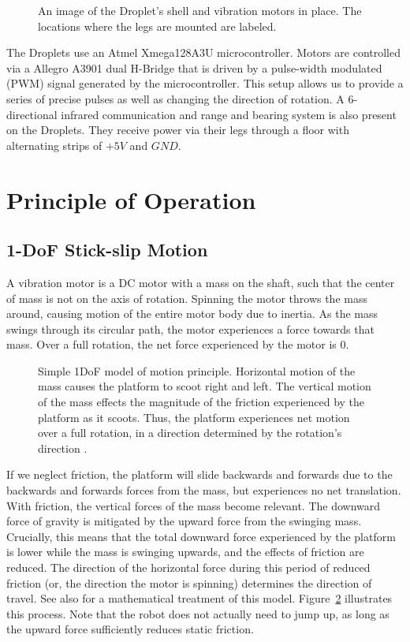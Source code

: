 \documentclass[letterpaper, 10pt, conference]{ieeeconf}
\begin{document}
\begin{figure}[!htb]
	\centering
	
	\caption{An image of the Droplet's shell and vibration motors in place. The locations where the legs are mounted are labeled.}
	\label{fig:PWMs}
\end{figure}

The Droplets use an Atmel Xmega128A3U microcontroller. Motors are controlled via a Allegro A3901 dual H-Bridge that is driven by a pulse-width modulated (PWM) signal generated by the microcontroller. This setup allows us to provide a series of precise pulses as well as changing the direction of rotation. A 6-directional infrared communication and range and bearing system \cite{farrow14} is also present on the Droplets. They receive power via their legs through a floor with alternating strips of $+5V$ and $GND$.


\section{Principle of Operation}

\subsection{1-DoF Stick-slip Motion}
A vibration motor is a DC motor with a mass on the shaft, such that the center of mass is not on the axis of rotation. Spinning the motor throws the mass around, causing motion of the entire motor body due to inertia. As the mass swings through its circular path, the motor experiences a force towards that mass. Over a full rotation, the net force experienced by the motor is 0.

\begin{figure}[!htb]
\centering

\caption{Simple 1DoF model of motion principle. Horizontal motion of the mass causes the platform to scoot right and left. The vertical motion of the mass effects the magnitude of the friction experienced by the platform as it scoots. Thus, the platform experiences net motion over a full rotation, in a direction determined by the rotation's direction \cite{Vartholomeos2005}.}
\label{motorDiagram}
\end{figure}

If we neglect friction, the platform will slide backwards and forwards due to the backwards and forwards forces from the mass, but experiences no net translation. With friction, the vertical forces of the mass become relevant. The downward force of gravity is mitigated by the upward force from the swinging mass. Crucially, this means that the total downward force experienced by the platform is lower while the mass is swinging upwards, and the effects of friction are reduced. The direction of the horizontal force during this period of reduced friction (or, the direction the motor is spinning) determines the direction of travel. See also \cite{Vartholomeos2005,Vartholomeos2006} for a mathematical treatment of this model. Figure~\ref{motorDiagram} illustrates this process. Note that the robot does not actually need to jump up, as long as the upward force sufficiently reduces static friction. 
\end{document}
